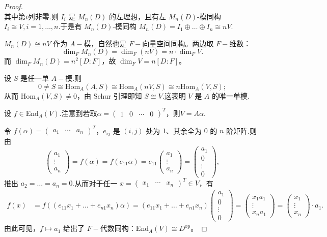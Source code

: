 \begin{proof}
$$$$
其中第$i$列非零.则 $I_i$ 是 $M_n(D)$ 的左理想，且有左 $M_n(D)$-模同构 $I_i \cong V, i = 1, \dots, n$.于是有 $M_n(D)$-模同构 $M_n(D) = I_1 \oplus \dots \oplus I_n \cong nV$.\par
\noindent{} $M_n(D) \cong nV$ 作为 $A-\!\!$模，自然也是 $F-\!\!$向量空间同构。两边取 $F-\!\!$维数：
\[
\dim_F M_n(D) = \dim_F(nV) = n \cdot \dim_F V.
\]
而 $\dim_F M_n(D) = n^2 [D:F]$，故 $\dim_F V = n[D:F]$。\par
\noindent{} 设 $S$ 是任一单 $A-\!\!$模.则
$$
0 \neq S \cong \mathrm{Hom}_A(A, S) \cong \mathrm{Hom}_A(nV, S) \cong n\mathrm{Hom}_A(V, S);
$$
从而 $\mathrm{Hom}_A(V, S) \neq 0$，由 Schur 引理即知 $S \cong V$.这表明 $V$ 是 $A$ 的唯一单模.\par
\noindent{} 设 $f \in \mathrm{End}_A(V)$.注意到若取$\alpha=\begin{pmatrix}1& 0& \cdots & 0\end{pmatrix}^T$，则$V = A\alpha$.\par
令 $f(\alpha) = \begin{pmatrix} a_1 & \cdots & a_n \end{pmatrix}^T$，$e_{ij}$ 是 $(i, j)$ 处为 $1$、其余全为 $0$ 的 $n$ 阶矩阵.则由
$$
\begin{pmatrix} a_1 \\ \vdots \\ a_n \end{pmatrix}
= f(\alpha) = f(e_{11}\alpha) = e_{11} \begin{pmatrix} a_1 \\ \vdots \\ a_n \end{pmatrix}
= \begin{pmatrix} a_1 \\ 0 \\ \vdots \\ 0 \end{pmatrix},
$$
推出 $a_2 = \dots = a_n = 0$.从而对于任一 $x = \begin{pmatrix} x_1 & \cdots & x_n \end{pmatrix}^T \in V$，有
$$
\begin{aligned}
f(x) &= f((e_{11}x_1 + \dots + e_{n1}x_n)\alpha) = (e_{11}x_1 + \dots + e_{n1}x_n) \begin{pmatrix} a_1 \\ 0 \\ \vdots \\ 0 \end{pmatrix} = \begin{pmatrix} x_1 a_1 \\ \vdots \\ x_n a_1 \end{pmatrix}
= \begin{pmatrix} x_1 \\ \vdots \\ x_n \end{pmatrix} \cdot a_1.
\end{aligned}
$$
由此可见，$f \mapsto a_1$ 给出了 $F-\!\!$代数同构：$\mathrm{End}_A(V) \cong D^{\mathrm{op}}$。



\end{proof}
